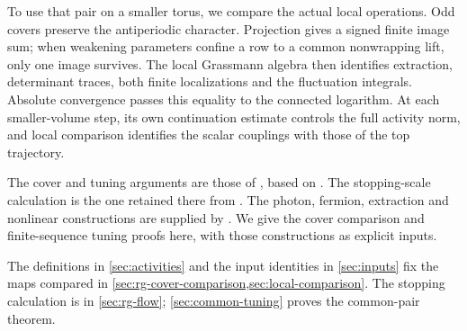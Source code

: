 To use that pair on a smaller torus, we compare the actual local
operations. Odd covers preserve the antiperiodic character. Projection
gives a signed finite image sum; when weakening parameters confine a
row to a common nonwrapping lift, only one image survives. The local
Grassmann algebra then identifies extraction, determinant traces, both
finite localizations and the fluctuation integrals. Absolute convergence
passes this equality to the connected logarithm. At each smaller-volume
step, its own continuation estimate controls the full activity norm,
and local comparison identifies the scalar couplings with those of the
top trajectory.

The cover and tuning arguments are those of
\cite[\S\S15--16]{QED3Master}, based on
\cite[Chapters~27--28]{ChamberRG}. The stopping-scale calculation is
the one retained there from \cite[Chapter~19]{LatticeCurvature}.
The photon, fermion, extraction and nonlinear constructions are supplied
by \cite{MaxwellBlockManuscript,FermionBlockManuscript,NormalizedContraction,NonlinearStep}.
We give the cover comparison and finite-sequence tuning proofs here,
with those constructions as explicit inputs.

The definitions in \cref{sec:activities} and the input identities in
\cref{sec:inputs} fix the maps compared in
\cref{sec:rg-cover-comparison,sec:local-comparison}.
The stopping calculation is in \cref{sec:rg-flow};
\cref{sec:common-tuning} proves the common-pair theorem.
